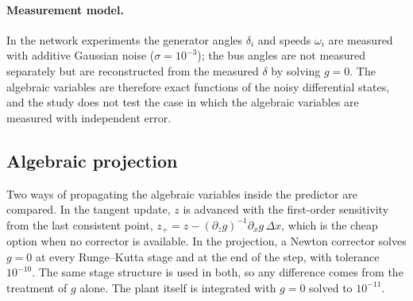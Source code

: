 \documentclass[preprint,12pt]{elsarticle}
\begin{document}
\paragraph{Measurement model.} In the network experiments the generator angles $\delta_i$ and speeds $\omega_i$ are measured with additive Gaussian noise ($\sigma=10^{-3}$); the bus angles are not measured separately but are reconstructed from the measured $\delta$ by solving $g=0$. The algebraic variables are therefore exact functions of the noisy differential states, and the study does not test the case in which the algebraic variables are measured with independent error.

\subsection{Algebraic projection}
Two ways of propagating the algebraic variables inside the predictor are compared. In the tangent update, $z$ is advanced with the first-order sensitivity from the last consistent point, $z_{+}=z-(\partial_z g)^{-1}\partial_x g\,\Delta x$, which is the cheap option when no corrector is available. In the projection, a Newton corrector solves $g=0$ at every Runge--Kutta stage and at the end of the step, with tolerance $10^{-10}$. The same stage structure is used in both, so any difference comes from the treatment of $g$ alone. The plant itself is integrated with $g=0$ solved to $10^{-11}$.
\end{document}
